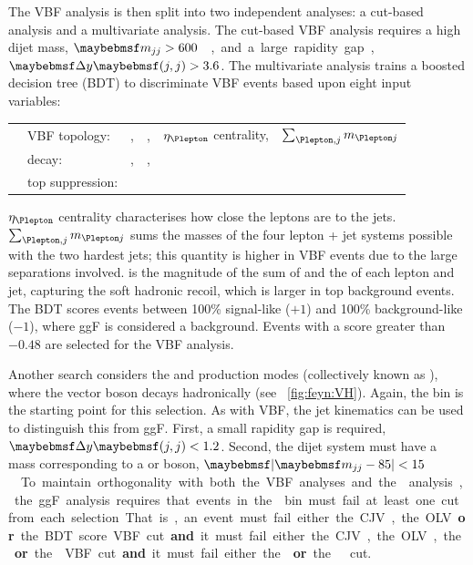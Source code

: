 The VBF analysis is then split into two independent analyses: a cut-based analysis and a 
multivariate analysis. The cut-based VBF analysis requires a high dijet mass, 
\unit{$\mjj > 600$}{\GeV}, and a large rapidity gap, $\dyjj > 3.6$. The multivariate 
analysis trains a boosted decision tree (BDT) \cite{TMVA} to discriminate VBF events based 
upon eight input variables:

\begin{listliketab}
	\begin{tabular}{Ll@{\hskip 0.3in}llll}
		\textbullet & VBF topology:    & \mjj, &\dyjj, &$\eta_{\Plepton}$ centrality, &$\sum_{\Plepton, j} m_{\Plepton j}$ \\
		\textbullet & \HWW decay:      & \mll, &\dphill, &\mt \\
		\textbullet & top suppression: & \pttot \\
	\end{tabular}
\end{listliketab}

\noindent
$\eta_{\Plepton}$ centrality characterises how close the leptons are to the jets. 
$\sum_{\Plepton, j} m_{\Plepton j}$ sums the masses of the four lepton + jet systems 
possible with the two hardest jets; this quantity is higher in VBF events due to the large 
separations involved. \pttot is the magnitude of the sum of \corrtrackmetvec and the \ptvec 
of each lepton and jet, capturing the soft hadronic recoil, which is larger in top 
background events. The BDT scores events between 100\% signal-like ($+1$) and 100\% 
background-like ($-1$), where ggF is considered a background. Events with a score greater 
than $-0.48$ are selected for the VBF analysis.

Another search considers the \WH and \ZH production modes (collectively known as \VH), 
where the vector boson decays hadronically (see \Figure~\ref{fig:feyn:VH}). Again, the 
\twojet bin is the starting point for this selection. As with VBF, the jet kinematics can 
be used to distinguish this from ggF. First, a small rapidity gap is required, $\dyjj < 1.2$.
Second, the dijet system must have a mass corresponding to a \PW or \PZ boson, 
\unit{$\mods{\mjj - 85} < 15$}{\GeV}.

To maintain orthogonality with both the VBF analyses and the \VH analysis, the ggF analysis 
requires that events in the \twojet bin must fail at least one cut from each selection. That 
is, an event must fail either the CJV, the OLV \textbf{or} the BDT score VBF cut 
\textbf{and} it must fail either the CJV, the OLV, the \mjj \textbf{or} the \dyjj VBF cut 
\textbf{and} it must fail either the \dyjj \textbf{or} the \mjj \VH cut.

